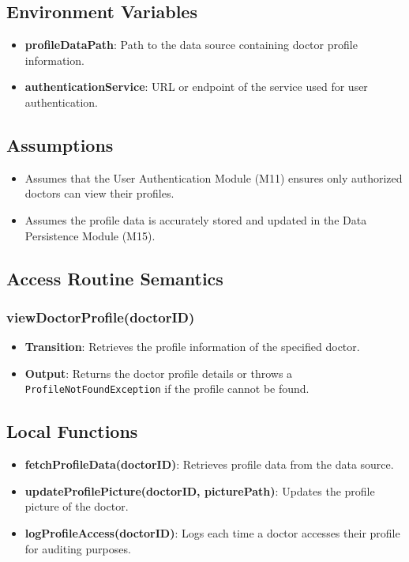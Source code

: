 \documentclass[12pt, titlepage]{article}
\begin{document}
\subsection{Environment Variables}
\begin{itemize}
\item \textbf{profileDataPath}: Path to the data source containing doctor profile information.
\item \textbf{authenticationService}: URL or endpoint of the service used for user authentication.
\end{itemize}

\subsection{Assumptions}
\begin{itemize}
\item Assumes that the User Authentication Module (M11) ensures only authorized doctors can view their profiles.
\item Assumes the profile data is accurately stored and updated in the Data Persistence Module (M15).
\end{itemize}

\subsection{Access Routine Semantics}
\subsubsection{viewDoctorProfile(doctorID)}
\begin{itemize}
    \item \textbf{Transition}: Retrieves the profile information of the specified doctor.
    \item \textbf{Output}: Returns the doctor profile details or throws a \texttt{ProfileNotFoundException} if the profile cannot be found.
\end{itemize}


\subsection{Local Functions}
\begin{itemize}
\item \textbf{fetchProfileData(doctorID)}: Retrieves profile data from the data source.
\item \textbf{updateProfilePicture(doctorID, picturePath)}: Updates the profile picture of the doctor.
\item \textbf{logProfileAccess(doctorID)}: Logs each time a doctor accesses their profile for auditing purposes.
\end{itemize}
\end{document}
